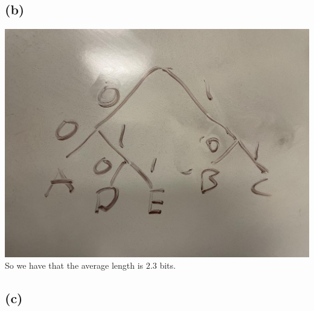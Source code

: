\subsection*{(b)}
\includegraphics[scale=0.25]{fig1.jpg}\\
So we have that the average length is $\boxed{2.3}$ bits.
\subsection*{(c)}

